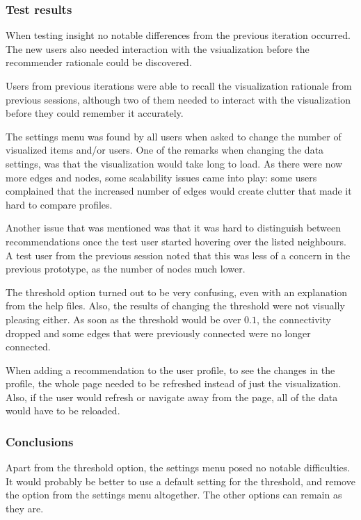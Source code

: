 \subsubsection{Test results}\label{chapter:prototype:section:soundsuggest2:results}

When testing insight no notable differences from the previous iteration occurred. The new users also needed interaction with the vsiualization before the recommender rationale could be discovered.

Users from previous iterations were able to recall the visualization rationale from previous sessions, although two of them needed to interact with the visualization before they could remember it accurately.

The settings menu was found by all users when asked to change the number of visualized items and/or users. One of the remarks when changing the data settings, was that the visualization would take long to load. As there were now more edges and nodes, some scalability issues came into play: some users complained that the increased number of edges would create clutter that made it hard to compare profiles.

Another issue that was mentioned was that it was hard to distinguish between recommendations once the test user started hovering over the listed neighbours. A test user from the previous session noted that this was less of a concern in the previous prototype, as the number of nodes much lower.

The threshold option turned out to be very confusing, even with an explanation from the help files. Also, the results of changing the threshold were not visually pleasing either. As soon as the threshold would be over $0.1$, the connectivity dropped and some edges that were previously connected were no longer connected.

When adding a recommendation to the user profile, to see the changes in the profile, the whole page needed to be refreshed instead of just the visualization. Also, if the user would refresh or navigate away from the page, all of the data would have to be reloaded.


\subsubsection{Conclusions}\label{chapter:prototype:section:soundsuggest2:conclusion}

Apart from the threshold option, the settings menu posed no notable difficulties. It would probably be better to use a default setting for the threshold, and remove the option from the settings menu altogether. The other options can remain as they are.

